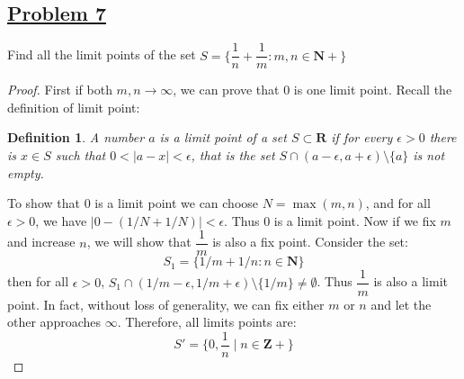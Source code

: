 \documentclass[10pt,letterpaper]{article}
\begin{document}
	\subsection*{{\color{purple}\underline{Problem 7}}}
	Find all the limit points of the set $S = \{\dfrac{1}{n} + \dfrac{1}{m} : m, n \in \mathbf{N+}\}$ \\
	\begin{proof}
	First if both $m, n \rightarrow \infty$, we can prove that $0$ is one limit point.
	Recall the definition of limit point:
	\newtheorem*{tm}{Definition} 
	\begin{tm}
	A number $a$ is a limit point of a set $S \subset \mathbf{R} $ if for every $\epsilon > 0$ there is $x \in S$ such that $0 < |a - x| < \epsilon$, that is the set $S \cap (a - \epsilon, a + \epsilon) \setminus \{a\}$ is not empty.
	\end{tm}
	To show that $0$ is a limit point we can choose $N = \max(m, n)$, and for all
	$\epsilon > 0$, we have $|0 - (1/N + 1/N)| < \epsilon$. Thus $0$ is a limit point.
	Now if we fix $m$ and increase $n$, we will show that $\dfrac{1}{m}$ is also a fix point.
	Consider the set:
	$$S_1 = \{1/m + 1/n: n \in \mathbf{N}\}$$
	then for all $\epsilon > 0$, $S_1 \cap (1/m - \epsilon, 1/m + \epsilon) \setminus \{1/m\} \neq \emptyset$.
	Thus $\dfrac{1}{m}$ is also a limit point. In fact, without loss of generality, we can fix either
	$m$ or $n$ and let the other approaches $\infty$. Therefore, all limits points are:
	$$S' = \{0, \dfrac{1}{n} \mid n \in \mathbf{Z+} \}$$ 
	\end{proof}
	
\end{document}
